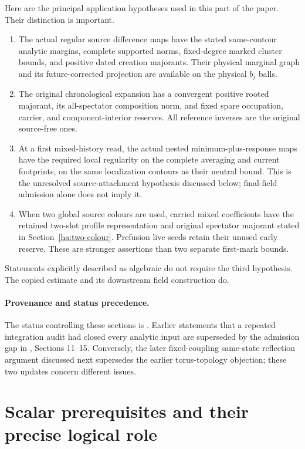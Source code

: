 Here are the principal application hypotheses used in this part of the
paper.  Their distinction is important.
\begin{enumerate}
\item The actual regular source difference maps have the stated
same-contour analytic margins, complete supported norms, fixed-degree
marked cluster bounds, and positive dated creation majorants.  Their
physical marginal graph and its future-corrected projection are available
on the physical $b_j$ balls.
\item The original chronological expansion has a convergent positive
rooted majorant, its all-spectator composition norm, and fixed spare
occupation, carrier, and component-interior reserves.  All reference
inverses are the original source-free ones.
\item At a first mixed-history read, the actual nested minimum-plus-response
maps have the required local regularity on the complete averaging and
current footprints, on the same localization contours as their neutral
bound.  This is the unresolved source-attachment hypothesis discussed
below; final-field admission alone does not imply it.
\item When two global source colours are used, carried mixed coefficients
have the retained two-slot profile representation and original spectator
majorant stated in Section~\ref{ha:two-colour}.  Prefusion live seeds
retain their unused early reserve.  These are stronger assertions than
two separate first-mark bounds.
\end{enumerate}
Statements explicitly described as algebraic do not require the third
hypothesis.  The copied estimate and its downstream field construction do.

\paragraph{Provenance and status precedence.}
The status controlling these sections is
.
Earlier statements that a repeated integration audit had closed every
analytic input are superseded by the admission gap in
,
Sections 11--15.  Conversely, the later fixed-coupling same-state
reflection argument discussed next supersedes the earlier torus-topology
objection; these two updates concern different issues.

\section{Scalar prerequisites and their precise logical role}
\label{ha:scalar}

